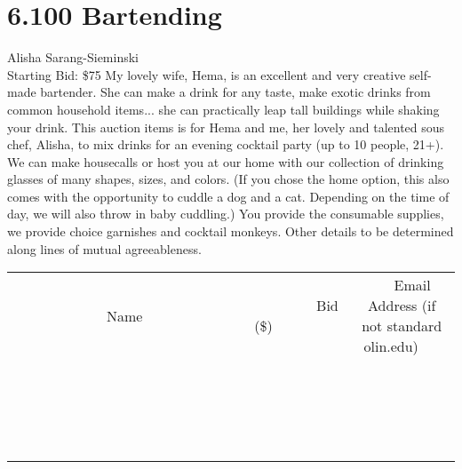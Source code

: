 \documentclass[11pt]{article}
\begin{document}
\section*{6.100 Bartending}
Alisha Sarang-Sieminski
\\
Starting Bid: \$75
\newline
My lovely wife, Hema, is an excellent and very creative self-made bartender. She can make a drink for any taste, make exotic drinks from common household items... she can practically leap tall buildings while shaking your drink. This auction items is for Hema and me, her lovely and talented sous chef, Alisha, to mix drinks for an evening cocktail party (up to 10 people, 21+). We can make housecalls or host you at our home with our collection of drinking glasses of many shapes, sizes, and colors. (If you chose the home option, this also comes with the opportunity to cuddle a dog and a cat. Depending on the time of day, we will also throw in baby cuddling.) You provide the consumable supplies, we provide choice garnishes and cocktail monkeys. Other details to be determined along lines of mutual agreeableness.
\\[3ex]
\begin{tabular}{c c c}
~~~~~~~~~~~~~Name~~~~~~~~~~~~~ & ~~~~~~~~~Bid (\$)~~~~~~~~~  & ~~~Email Address (if not standard olin.edu)~~~\\
 & & \\
\hline
 & & \\
\hline
 & & \\
\hline
 & & \\
\hline
 & & \\
\hline
 & & \\
\hline
 & & \\
\hline
 & & \\
\hline
 & & \\
\hline
 & & \\
\hline
 & & \\
\hline
 & & \\
\hline
 & & \\
\hline
 & & \\
\hline
 & & \\
\hline
 & & \\
\hline
 & & \\
\hline
 & & \\
\hline
 & & \\
\hline
\end{tabular}
\newpage
\end{document}
